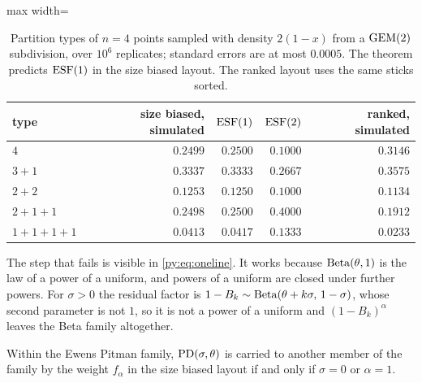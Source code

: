 \begin{table}[t]
\centering
\caption{Partition types of $n = 4$ points sampled with density $2(1-x)$ from a $\mathrm{GEM}(2)$
subdivision, over $10^{6}$ replicates; standard errors are at most $0.0005$. The theorem predicts
$\mathrm{ESF}(1)$ in the size biased layout. The ranked layout uses the same sticks sorted.}
\label{py:tab:onepar_sim}
\small
\begin{adjustbox}{max width=\textwidth}
\begin{tabular}{lrrrr}
\toprule
type & size biased, simulated & $\mathrm{ESF}(1)$ & $\mathrm{ESF}(2)$ & ranked, simulated\\
\midrule
$4$             & $0.2499$ & $0.2500$ & $0.1000$ & $0.3146$\\
$3{+}1$         & $0.3337$ & $0.3333$ & $0.2667$ & $0.3575$\\
$2{+}2$         & $0.1253$ & $0.1250$ & $0.1000$ & $0.1134$\\
$2{+}1{+}1$     & $0.2498$ & $0.2500$ & $0.4000$ & $0.1912$\\
$1{+}1{+}1{+}1$ & $0.0413$ & $0.0417$ & $0.1333$ & $0.0233$\\
\bottomrule
\end{tabular}
\end{adjustbox}
\end{table}

The step that fails is visible in \eqref{py:eq:oneline}. It works because $\mathrm{Beta}(\theta,1)$ is the law
of a power of a uniform, and powers of a uniform are closed under further powers. For $\sigma > 0$
the residual factor is $1-B_k \sim \mathrm{Beta}(\theta+k\sigma,\, 1-\sigma)$, whose second parameter is not
$1$, so it is not a power of a uniform and $(1-B_k)^{\alpha}$ leaves the Beta family altogether.

\begin{theorem}
\label{py:thm:pitman}
Within the Ewens Pitman family, $\mathrm{PD}(\sigma,\theta)$ is carried to another member of the family by
the weight $f_\alpha$ in the size biased layout if and only if $\sigma = 0$ or $\alpha = 1$.
\end{theorem}

